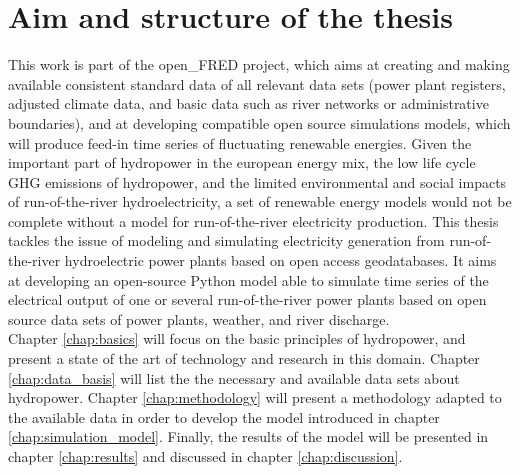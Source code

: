 \section{Aim and structure of the thesis}
This work is part of the open\_FRED project, which aims at creating and making available consistent standard data of all relevant data sets (power plant registers, adjusted climate data, and basic data such as river networks or administrative boundaries), and at developing compatible open source simulations models, which will produce feed-in time series of fluctuating renewable energies. \newline
Given the important part of hydropower in the european energy mix, the low life cycle GHG emissions of hydropower, and the limited environmental and social impacts of run-of-the-river hydroelectricity, a set of renewable energy models would not be complete without a model for run-of-the-river electricity production. \newline
This thesis tackles the issue of modeling and simulating electricity generation from run-of-the-river hydroelectric power plants based on open access geodatabases. It aims at developing an open-source Python model able to simulate time series of the electrical output of one or several run-of-the-river power plants based on open source data sets of power plants, weather, and river discharge. \\
Chapter \ref{chap:basics} will focus on the basic principles of hydropower, and present a state of the art of technology and research in this domain. Chapter \ref{chap:data_basis} will list the the necessary and available data sets about hydropower. Chapter \ref{chap:methodology} will present a methodology adapted to the available data in order to develop the model introduced in chapter \ref{chap:simulation_model}. Finally, the results of the model will be presented in chapter \ref{chap:results} and discussed in chapter \ref{chap:discussion}.

